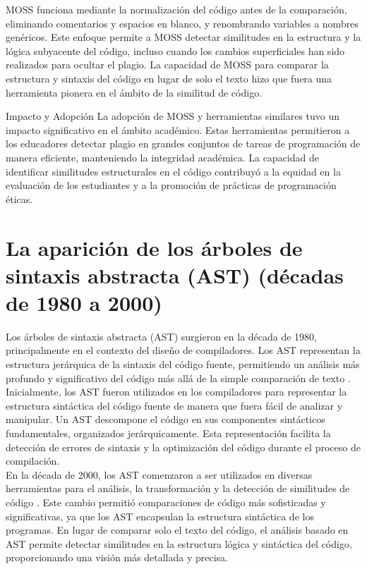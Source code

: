 MOSS funciona mediante la normalización del código antes de la comparación, eliminando comentarios y espacios en blanco, y renombrando variables a nombres genéricos. Este enfoque permite a MOSS detectar similitudes en la estructura y la lógica subyacente del código, incluso cuando los cambios superficiales han sido realizados para ocultar el plagio. La capacidad de MOSS para comparar la estructura y sintaxis del código en lugar de solo el texto hizo que fuera una herramienta pionera en el ámbito de la similitud de código.

Impacto y Adopción
La adopción de MOSS y herramientas similares tuvo un impacto significativo en el ámbito académico. Estas herramientas permitieron a los educadores detectar plagio en grandes conjuntos de tareas de programación de manera eficiente, manteniendo la integridad académica. La capacidad de identificar similitudes estructurales en el código contribuyó a la equidad en la evaluación de los estudiantes y a la promoción de prácticas de programación éticas.

\section*{\textbf{La aparición de los árboles de sintaxis abstracta (AST) (décadas de 1980 a 2000)}}
Los árboles de sintaxis abstracta (AST) surgieron en la década de 1980, principalmente en el contexto del diseño de compiladores. Los AST representan la estructura jerárquica de la sintaxis del código fuente, permitiendo un análisis más profundo y significativo del código más allá de la simple comparación de texto \cite{aho1986compilers}. \\

Inicialmente, los AST fueron utilizados en los compiladores para representar la estructura sintáctica del código fuente de manera que fuera fácil de analizar y manipular. Un AST descompone el código en sus componentes sintácticos fundamentales, organizados jerárquicamente. Esta representación facilita la detección de errores de sintaxis y la optimización del código durante el proceso de compilación. \\

En la década de 2000, los AST comenzaron a ser utilizados en diversas herramientas para el análisis, la transformación y la detección de similitudes de código \cite{muchnick1997advanced}. Este cambio permitió comparaciones de código más sofisticadas y significativas, ya que los AST encapsulan la estructura sintáctica de los programas. En lugar de comparar solo el texto del código, el análisis basado en AST permite detectar similitudes en la estructura lógica y sintáctica del código, proporcionando una visión más detallada y precisa. \\

